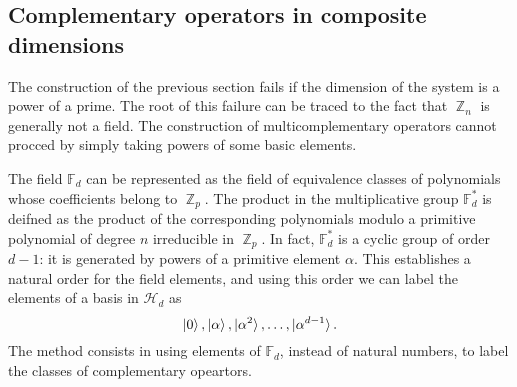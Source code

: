 \documentclass[a4paper]{article}
\DeclareMathOperator{\Z}{\mathbb{Z}}
\begin{document}
  \subsection{Complementary operators in composite
  dimensions}

  The construction of the previous section fails if the
  dimension of the system is a power of a prime. The root of
  this failure can be traced to the fact that $\Z_n$ is
  generally not a field. The construction of
  multicomplementary operators cannot procced by simply
  taking powers of some basic elements.

  The field $\mathbb{F}_d$ can be represented as the field
  of equivalence classes of polynomials whose coefficients
  belong to $\Z_p$. The product in the multiplicative group
  $\mathbb{F}_d^*$ is deifned as the product of the
  corresponding polynomials modulo a primitive polynomial of
  degree $n$ irreducible in $\Z_p$. In fact,
  $\mathbb{F}_d^*$ is a cyclic group of order $d-1$: it is
  generated by powers of a primitive element $\alpha$. This
  establishes a natural order for the field elements, and
  using this order we can label the elements of a basis in
  $\mathcal{H}_d$ as
  \[
    \ket 0, \ket \alpha,
    \ket{\alpha^2},\ldots,\ket{\alpha^{d-1}}.
  \] 
  The method consists in using elements of $\mathbb{F}_d$,
  instead of natural numbers, to label the classes of
  complementary opeartors.
\end{document}
